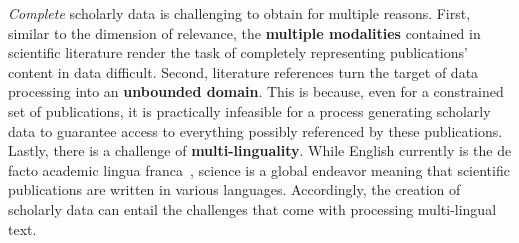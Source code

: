 \textit{Complete} scholarly data is challenging to obtain for multiple reasons. First, similar to the dimension of relevance, the \textbf{multiple modalities} contained in scientific literature render the task of completely representing publications' content in data difficult. Second, literature references turn the target of data processing into an \textbf{unbounded domain}. This is because, even for a constrained set of publications, it is practically infeasible for a process generating scholarly data to guarantee access to everything possibly referenced by these publications. Lastly, there is a challenge of \textbf{multi-linguality}. While English currently is the de facto academic lingua franca~\cite{Montgomery2013}, science is a global endeavor meaning that scientific publications are written in various languages. Accordingly, the creation of scholarly data can entail the challenges that come with processing multi-lingual text.
 


